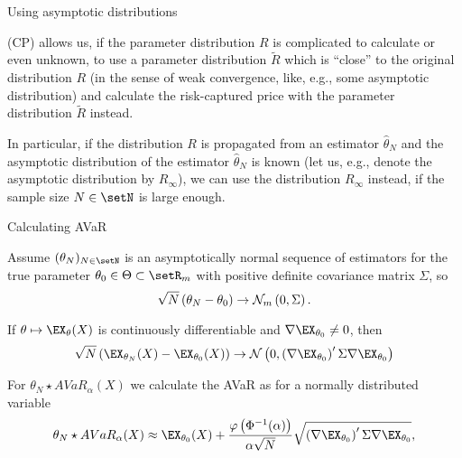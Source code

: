 {Using asymptotic distributions}
\item (CP) allows us, if the parameter distribution $R$ is complicated to calculate or even unknown, to use a parameter distribution $\tilde{R}$ which is ``close'' to the original distribution $R$ (in the sense of weak convergence, like, e.g., some asymptotic distribution) and calculate the risk-captured price with the parameter distribution $\tilde{R}$ instead.
\item In particular, if the distribution $R$ is propagated from an estimator $\hat{\theta}_N$ and the asymptotic distribution of the estimator $\hat{\theta}_N$ is known (let us, e.g., denote the asymptotic distribution by $R_\infty$), we can use the distribution $R_\infty$ instead, if the sample size $N\in\setN$ is large enough.

{Calculating AVaR}
\item Assume $(\theta_N)_{N \in \setN}$ is an asymptotically normal sequence of estimators for the true parameter $\theta_0 \in \Theta \subset \setR_m$  with positive definite covariance matrix $\Sigma$, so
$$
\sqrt{N}\left(\theta_N -\theta_0\right) \rightarrow {\cal N}_m \left(0,\Sigma\right).
$$
\item If $\theta \mapsto \EX_\theta(X)$ is continuously differentiable and $\nabla  \EX_{\theta_0} \not =0$, then
$$
\sqrt{N}\left(\EX_{\theta_N}(X)-\EX_{\theta_0}(X)\right) \rightarrow {\cal N}\left(0, \left(\nabla \EX_{\theta_0}\right)' \Sigma \nabla \EX_{\theta_0}\right)
$$
\item For $\theta_N \star AVaR_\alpha(X)$ we calculate the AVaR as for a normally distributed variable
$$
\theta_N \star AVaR_\alpha(X) \approx \EX_{\theta_0}(X) + \frac{\varphi\left(\Phi^{-1}(\alpha)\right)}{\alpha\sqrt{N}} \sqrt{\left(\nabla \EX_{\theta_0}\right)' \Sigma \nabla \EX_{\theta_0}},
$$

